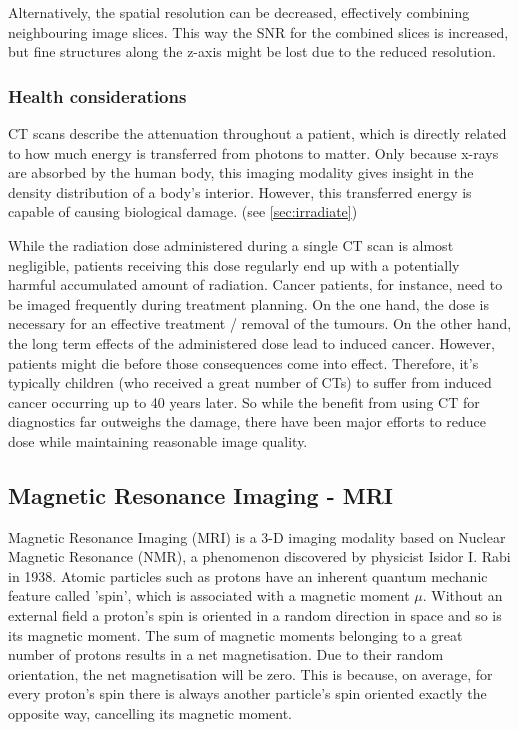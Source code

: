 Alternatively, the spatial resolution can be decreased, effectively combining neighbouring image slices.
This way the SNR for the combined slices is increased, but fine structures along the z-axis might be lost due to the reduced resolution. \cite{Podgorsak, Maidment2014}

\subsubsection{Health considerations}
CT scans describe the attenuation throughout a patient, which is directly related to how much energy is transferred from photons to matter.
Only because x-rays are absorbed by the human body, this imaging modality gives insight in the density distribution of a body's interior.
However, this transferred energy is capable of causing biological damage. (see \ref{sec:irradiate})

While the radiation dose administered during a single CT scan is almost negligible, patients receiving this dose regularly end up with a potentially harmful accumulated amount of radiation.
Cancer patients, for instance, need to be imaged frequently during treatment planning.
On the one hand, the dose is necessary for an effective treatment / removal of the tumours.
On the other hand, the long term effects of the administered dose lead to induced cancer.
However, patients might die before those consequences come into effect.
Therefore, it's typically children (who received a great number of CTs) to suffer from induced cancer occurring up to 40 years later.
So while the benefit from using CT for diagnostics far outweighs the damage, there have been major efforts to reduce dose while maintaining reasonable image quality.
\cite{Murphy2007, Brenner2001, Sodickson2009, Smith2007, McCollough2009, Goldman2013}


\subsection{Magnetic Resonance Imaging - MRI}
\label{sec:MRI}
Magnetic Resonance Imaging (MRI) is a 3-D imaging modality based on Nuclear Magnetic Resonance (NMR), a phenomenon discovered by physicist Isidor I. Rabi in 1938.
Atomic particles such as protons have an inherent quantum mechanic feature called 'spin', which is associated with a magnetic moment $\mu$.
Without an external field a proton's spin is oriented in a random direction in space and so is its magnetic moment.
The sum of magnetic moments belonging to a great number of protons results in a net magnetisation.
Due to their random orientation, the net magnetisation will be zero.
This is because, on average, for every proton's spin there is always another particle's spin oriented exactly the opposite way, cancelling its magnetic moment.

